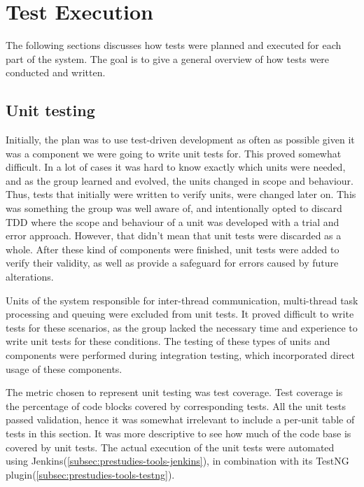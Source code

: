 \section{Test Execution}
\label{subsec:testing-test_execution}

The following sections discusses how tests were planned and executed for each part of the system. The goal is to give a general overview of how tests were conducted and written.

\subsection{Unit testing}
\label{subsec:testing-test_execution-unit_testing}

Initially, the plan was to use test-driven development as often as possible given it was a component we were going to write unit tests for. This proved somewhat difficult. In a lot of cases it was hard to know exactly which units were needed, and as the group learned and evolved, the units changed in scope and behaviour. Thus, tests that initially were written to verify units, were changed later on. This was something the group was well aware of, and intentionally opted to discard TDD where the scope and behaviour of a unit was developed with a trial and error approach. However, that didn't mean that unit tests were discarded as a whole. After these kind of components were finished, unit tests were added to verify their validity, as well as provide a safeguard for errors caused by future alterations.

Units of the system responsible for inter-thread communication, multi-thread task processing and queuing were excluded from unit tests. It proved difficult to write tests for these scenarios, as the group lacked the necessary time and experience to write unit tests for these conditions. The testing of these types of units and components were performed during integration testing, which incorporated direct usage of these components.

The metric chosen to represent unit testing was test coverage. Test coverage is the percentage of code blocks covered by corresponding tests. All the unit tests passed validation, hence it was somewhat irrelevant to include a per-unit table of tests in this section. It was more descriptive to see how much of the code base is covered by unit tests. The actual execution of the unit tests were automated using Jenkins(\ref{subsec:prestudies-tools-jenkins}), in combination with its TestNG plugin(\ref{subsec:prestudies-tools-testng}).

